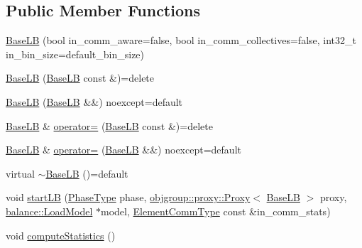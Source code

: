 \subsection*{Public Member Functions}
\begin{DoxyCompactItemize}
\item 
\hyperlink{structvt_1_1vrt_1_1collection_1_1lb_1_1_base_l_b_addef25b03975034a0936c515a2942d43}{Base\+LB} (bool in\+\_\+comm\+\_\+aware=false, bool in\+\_\+comm\+\_\+collectives=false, int32\+\_\+t in\+\_\+bin\+\_\+size=default\+\_\+bin\+\_\+size)
\item 
\hyperlink{structvt_1_1vrt_1_1collection_1_1lb_1_1_base_l_b_af34c68c8ecf1341189a67c3405036d16}{Base\+LB} (\hyperlink{structvt_1_1vrt_1_1collection_1_1lb_1_1_base_l_b}{Base\+LB} const \&)=delete
\item 
\hyperlink{structvt_1_1vrt_1_1collection_1_1lb_1_1_base_l_b_a1d1ae8a311e14e27b26624caee930535}{Base\+LB} (\hyperlink{structvt_1_1vrt_1_1collection_1_1lb_1_1_base_l_b}{Base\+LB} \&\&) noexcept=default
\item 
\hyperlink{structvt_1_1vrt_1_1collection_1_1lb_1_1_base_l_b}{Base\+LB} \& \hyperlink{structvt_1_1vrt_1_1collection_1_1lb_1_1_base_l_b_a94be0abcbc47bf6a3f3685f94dd5d4cb}{operator=} (\hyperlink{structvt_1_1vrt_1_1collection_1_1lb_1_1_base_l_b}{Base\+LB} const \&)=delete
\item 
\hyperlink{structvt_1_1vrt_1_1collection_1_1lb_1_1_base_l_b}{Base\+LB} \& \hyperlink{structvt_1_1vrt_1_1collection_1_1lb_1_1_base_l_b_a1e092a34c8e4eda0a05ab3a2f5a9ae45}{operator=} (\hyperlink{structvt_1_1vrt_1_1collection_1_1lb_1_1_base_l_b}{Base\+LB} \&\&) noexcept=default
\item 
virtual \hyperlink{structvt_1_1vrt_1_1collection_1_1lb_1_1_base_l_b_a2d4e31b7ae227886a24443334114269e}{$\sim$\+Base\+LB} ()=default
\item 
void \hyperlink{structvt_1_1vrt_1_1collection_1_1lb_1_1_base_l_b_a47fca52d6d490f8ab83aaea5058abf92}{start\+LB} (\hyperlink{namespacevt_a46ce6733d5cdbd735d561b7b4029f6d7}{Phase\+Type} phase, \hyperlink{structvt_1_1objgroup_1_1proxy_1_1_proxy}{objgroup\+::proxy\+::\+Proxy}$<$ \hyperlink{structvt_1_1vrt_1_1collection_1_1lb_1_1_base_l_b}{Base\+LB} $>$ proxy, \hyperlink{classvt_1_1vrt_1_1collection_1_1balance_1_1_load_model}{balance\+::\+Load\+Model} $\ast$model, \hyperlink{structvt_1_1vrt_1_1collection_1_1lb_1_1_base_l_b_ac3f8560bfe41aa593eb7d5bd1241cc4c}{Element\+Comm\+Type} const \&in\+\_\+comm\+\_\+stats)
\item 
void \hyperlink{structvt_1_1vrt_1_1collection_1_1lb_1_1_base_l_b_a44ab2755595d800e50576fa53bee7d91}{compute\+Statistics} ()

\end{DoxyCompactItemize}
